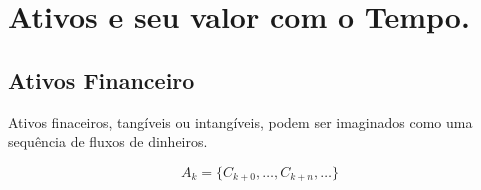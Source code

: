 \chapter{Ativos e seu valor com o Tempo.}

\section{Ativos Financeiro}

Ativos finaceiros, tangíveis ou intangíveis, podem ser imaginados como uma sequência de fluxos de dinheiros.

\begin{equation}
    A_{k} = \lbrace C_{k + 0}, \ldots, C_{k + n}, \ldots  \rbrace
\end{equation}


